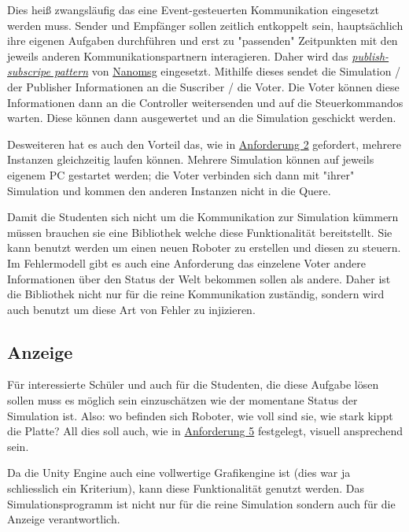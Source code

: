 Dies hei{\ss} zwangsl{\"{a}}ufig das eine Event-gesteuerten Kommunikation eingesetzt werden muss. Sender und Empf{\"{a}}nger
sollen zeitlich entkoppelt sein, haupts{\"{a}}chlich ihre eigenen Aufgaben durchf{\"{u}}hren und erst zu "passenden" Zeitpunkten
mit den jeweils anderen Kommunikationspartnern interagieren. Daher wird das \hyperref[pubsub]{\textit{publish-subscripe pattern}}
von \hyperref[nanomsg]{Nanomsg} eingesetzt. Mithilfe dieses sendet die Simulation / der Publisher
Informationen an die Suscriber / die Voter. Die Voter k{\"{o}}nnen diese Informationen dann an die Controller weitersenden und auf die
Steuerkommandos warten. Diese k{\"{o}}nnen dann ausgewertet und an die Simulation geschickt werden.

Desweiteren hat es auch den Vorteil das, wie in \hyperref[Anforderung]{Anforderung 2} gefordert, mehrere Instanzen gleichzeitig
laufen k{\"{o}}nnen. Mehrere Simulation k{\"{o}}nnen auf jeweils eigenem PC gestartet werden; die Voter verbinden sich dann mit "ihrer"
Simulation und kommen den anderen Instanzen nicht in die Quere.

Damit die Studenten sich nicht um die Kommunikation zur Simulation k{\"{u}}mmern m{\"{u}}ssen brauchen sie eine Bibliothek welche
diese Funktionalit{\"{a}}t bereitstellt. Sie kann benutzt werden um einen neuen Roboter zu erstellen und diesen zu steuern.
Im Fehlermodell gibt es auch eine Anforderung das einzelene Voter andere Informationen {\"{u}}ber den Status der Welt
bekommen sollen als andere. Daher ist die Bibliothek nicht nur f{\"{u}}r die reine Kommunikation zust{\"{a}}ndig, sondern wird auch
benutzt um diese Art von Fehler zu injizieren.

\subsection{Anzeige}\label{graphics}
F{\"{u}}r interessierte Sch{\"{u}}ler und auch f{\"{u}}r die Studenten, die diese Aufgabe l{\"{o}}sen
sollen muss es m{\"{o}}glich sein einzusch{\"{a}}tzen wie der momentane Status der Simulation ist.
Also: wo befinden sich Roboter, wie voll sind sie, wie stark kippt die Platte? All dies soll auch, wie
in \hyperref[anforderung]{Anforderung 5} festgelegt, visuell ansprechend sein.

Da die Unity Engine auch eine vollwertige Grafikengine ist (dies war ja schliesslich ein Kriterium),
kann diese Funktionalit{\"{a}}t genutzt werden. Das Simulationsprogramm ist nicht nur f{\"{u}}r die
reine Simulation sondern auch f{\"{u}}r die Anzeige verantwortlich.

